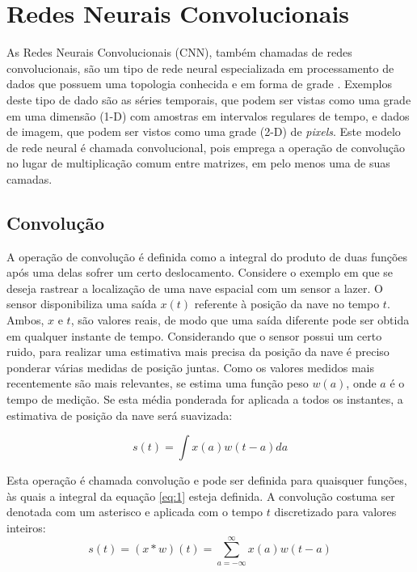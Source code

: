 
\section{Redes Neurais Convolucionais}
As Redes Neurais Convolucionais (CNN), também chamadas de redes convolucionais,
são um tipo de rede neural especializada em processamento de dados que possuem uma
topologia conhecida e em forma de grade \cite{Gdfl16}. Exemplos deste tipo de dado são as séries
temporais, que podem ser vistas como uma grade em uma dimensão (1-D) com amostras
em intervalos regulares de tempo, e dados de imagem, que podem ser vistos como
uma grade (2-D) de \textit{pixels}. Este modelo de rede neural é chamada convolucional,
pois emprega a operação de convolução no lugar de multiplicação comum entre matrizes,
em pelo menos uma de suas camadas.

\subsection{Convolução}
A operação de convolução é definida como a integral do produto de duas funções após uma delas sofrer um
certo deslocamento. Considere o exemplo em que se deseja rastrear a localização de uma
nave espacial com um sensor a lazer. O sensor disponibiliza uma saída $x(t)$ referente à posição da nave
no tempo $t$. Ambos, $x$ e $t$, são valores reais, de modo que uma saída diferente pode ser obtida
em qualquer instante de tempo. Considerando que o sensor possui um certo ruido, para realizar uma
estimativa mais precisa da posição da nave é preciso ponderar várias medidas de posição juntas.
Como os valores medidos mais recentemente são mais relevantes, se estima uma função peso
$w(a)$, onde $a$ é o tempo de medição. Se esta média ponderada for aplicada a todos os instantes,
a estimativa de posição da nave será suavizada:

\begin{equation}
 s(t) = \int{x(a) w(t-a)da}
 \label{eq:1}
\end{equation}

Esta operação é chamada convolução e pode ser definida para quaisquer
funções, às quais a integral da equação \ref{eq:1} esteja definida. A convolução
costuma ser denotada com um asterisco e aplicada com o tempo $t$ discretizado para valores inteiros:
\begin{equation}
 s(t) = (x * w)(t) = \sum_{a=-\infty}^{\infty}{x(a)w(t-a)}
 \label{eq:2}
\end{equation}

